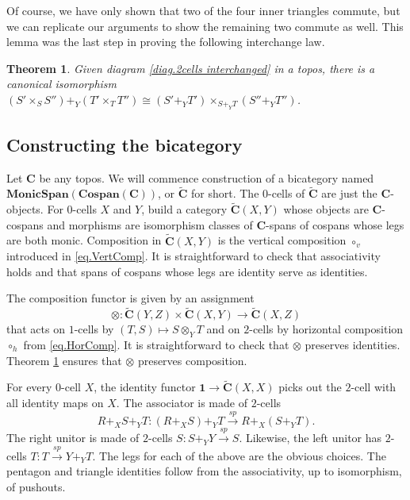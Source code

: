 \documentclass[11pt]{amsart}
\newcommand{\cat}[1]{\mathbf{#1}}
\newcommand{\from}{\colon}
\renewcommand{\span}{\xrightarrow{\mathit{sp}}}
\newcommand{\csC}{\widetilde{\mathbf{C}}}
\newtheorem{thm}{Theorem}[section]
\theoremstyle{remark}
\theoremstyle{definition}
\begin{document}
%
%
%
%
%

Of course, we have only shown that two of the four inner triangles commute, but we can replicate our arguments to show the remaining two commute as well.  This lemma was the last step in proving the following interchange law.

\begin{thm}
	\label{thm.interchange law}
	Given diagram \eqref{diag.2cells interchanged} in a topos, there is a canonical isomorphism $(S' \times_S S'') +_Y (T' \times_T T'') \cong (S' +_Y T') \times_{S +_Y T} ( S'' +_Y T'')$.
\end{thm}

%
%
%
%
%
%
\subsection{Constructing the bicategory}  %
%
%
%
%
%
%
%

Let $\cat{C}$ be any topos. We will commence construction of a bicategory named $\cat{MonicSpan(Cospan(C))}$, or $\csC$ for short. The $0$-cells of $\csC$ are just the $\cat{C}$-objects. For $0$-cells $X$ and $Y$, build a category $\csC(X,Y)$ whose objects are $\cat{C}$-cospans and morphisms are isomorphism classes of $\cat{C}$-spans of cospans whose legs are both monic. Composition in $\csC (X,Y)$ is the vertical composition $\circ_v$ introduced in \eqref{eq.VertComp}. It is straightforward to check that associativity holds and that spans of cospans whose legs are identity serve as identities.
%
%
%
%
%
%

The composition functor is given by an assignment
\[
\otimes \from \csC(Y,Z) \times \csC(X,Y) \to \csC(X,Z)
\]
that acts on $1$-cells by $(T,S) \mapsto S \otimes_Y T$ and on $2$-cells by horizontal composition $\circ_h$ from \eqref{eq.HorComp}. It is straightforward to check that $\otimes$ preserves identities. Theorem \ref{thm.interchange law} ensures that $\otimes$ preserves composition.
%
%
%
%
%

For every $0$-cell $X$, the identity functor $\cat{1} \to \csC (X,X)$ picks out the $2$-cell with all identity maps on $X$. The associator is made of $2$-cells 
\[
R+_XS+_YT \from (R+_XS)+_YT \span R+_X(S+_YT).
\] 
The right unitor is made of $2$-cells $S \from S+_YY \span S$. Likewise, the left unitor has $2$-cells $T \from T \span Y+_YT$. The legs for each of the above are the obvious choices. The pentagon and triangle identities follow from the associativity, up to isomorphism, of pushouts. 
%
%
%
%
%
\end{document}
